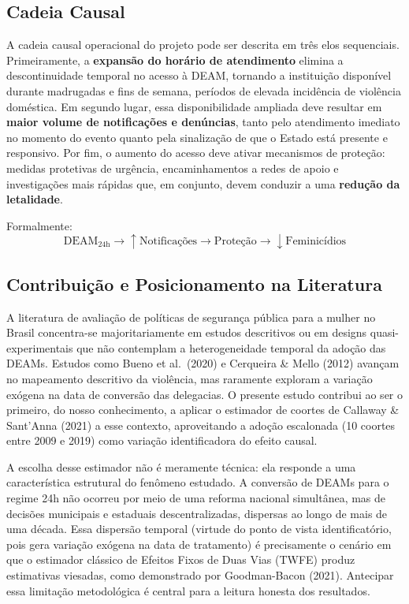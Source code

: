 \documentclass[twocolumn, 10pt]{article}
\begin{document}
\subsection{Cadeia Causal}

A cadeia causal operacional do projeto pode ser descrita em três elos
sequenciais. Primeiramente, a \textbf{expansão do horário de atendimento}
elimina a descontinuidade temporal no acesso à DEAM, tornando a instituição
disponível durante madrugadas e fins de semana, períodos de elevada incidência
de violência doméstica. Em segundo lugar, essa disponibilidade ampliada deve
resultar em \textbf{maior volume de notificações e denúncias}, tanto pelo
atendimento imediato no momento do evento quanto pela sinalização de que o
Estado está presente e responsivo. Por fim, o aumento do acesso deve ativar
mecanismos de proteção: medidas protetivas de urgência, encaminhamentos a
redes de apoio e investigações mais rápidas que, em conjunto, devem conduzir
a uma \textbf{redução da letalidade}.

Formalmente:
\[
  \text{DEAM}_{24\text{h}} \to \uparrow\text{Notificações}
  \to \text{Proteção} \to \downarrow\text{Feminicídios}
\]

\subsection{Contribuição e Posicionamento na Literatura}

A literatura de avaliação de políticas de segurança pública para a mulher no
Brasil concentra-se majoritariamente em estudos descritivos ou em designs
quasi-experimentais que não contemplam a heterogeneidade temporal da adoção
das DEAMs. Estudos como Bueno et al.\ (2020) e Cerqueira \& Mello (2012) avançam
no mapeamento descritivo da violência, mas raramente exploram a variação
exógena na data de conversão das delegacias. O presente estudo contribui ao
ser o primeiro, do nosso conhecimento, a aplicar o estimador de coortes de
Callaway \& Sant'Anna (2021) a esse contexto, aproveitando a adoção escalonada
(10 coortes entre 2009 e 2019) como variação identificadora do efeito causal.

A escolha desse estimador não é meramente técnica: ela responde a uma
característica estrutural do fenômeno estudado. A conversão de DEAMs para o
regime 24h não ocorreu por meio de uma reforma nacional simultânea, mas de
decisões municipais e estaduais descentralizadas, dispersas ao longo de mais de
uma década. Essa dispersão temporal (virtude do ponto de vista identificatório,
pois gera variação exógena na data de tratamento) é precisamente o cenário em
que o estimador clássico de Efeitos Fixos de Duas Vias (TWFE) produz estimativas
viesadas, como demonstrado por Goodman-Bacon (2021). Antecipar essa limitação
metodológica é central para a leitura honesta dos resultados.
\end{document}
